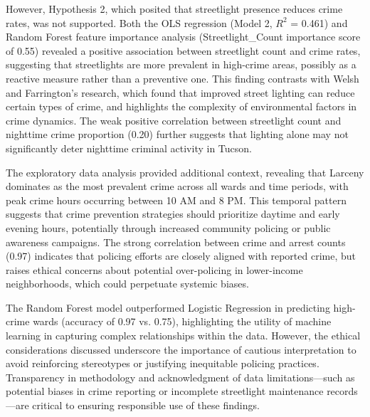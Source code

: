 \documentclass{report}
\begin{document}
\par However, Hypothesis 2, which posited that streetlight presence reduces crime rates, was not supported. Both the OLS regression (Model 2, $R^2$ = 0.461) and Random Forest feature importance analysis (Streetlight\_Count importance score of 0.55) revealed a positive association between streetlight count and crime rates, suggesting that streetlights are more prevalent in high-crime areas, possibly as a reactive measure rather than a preventive one. This finding contrasts with Welsh and Farrington's \cite{welsh08} research, which found that improved street lighting can reduce certain types of crime, and highlights the complexity of environmental factors in crime dynamics. The weak positive correlation between streetlight count and nighttime crime proportion (0.20) further suggests that lighting alone may not significantly deter nighttime criminal activity in Tucson.

\par The exploratory data analysis provided additional context, revealing that Larceny dominates as the most prevalent crime across all wards and time periods, with peak crime hours occurring between 10 AM and 8 PM. This temporal pattern suggests that crime prevention strategies should prioritize daytime and early evening hours, potentially through increased community policing or public awareness campaigns. The strong correlation between crime and arrest counts (0.97) indicates that policing efforts are closely aligned with reported crime, but raises ethical concerns about potential over-policing in lower-income neighborhoods, which could perpetuate systemic biases.

\par The Random Forest model outperformed Logistic Regression in predicting high-crime wards (accuracy of 0.97 vs. 0.75), highlighting the utility of machine learning in capturing complex relationships within the data. However, the ethical considerations discussed underscore the importance of cautious interpretation to avoid reinforcing stereotypes or justifying inequitable policing practices. Transparency in methodology and acknowledgment of data limitations—such as potential biases in crime reporting or incomplete streetlight maintenance records—are critical to ensuring responsible use of these findings.
\end{document}
